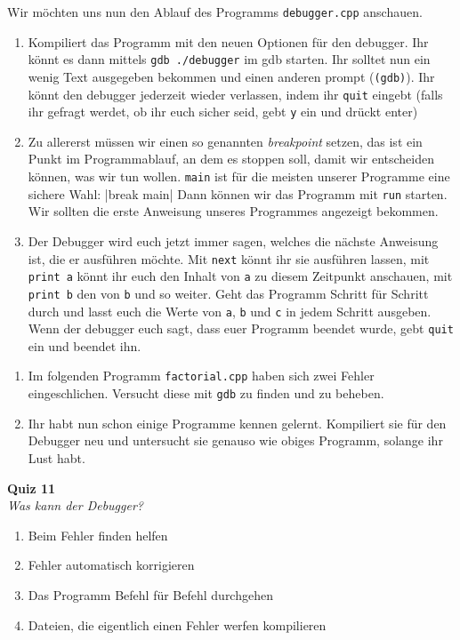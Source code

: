 \newpage

\begin{praxis}

	Wir möchten uns nun den Ablauf des Programms \texttt{debugger.cpp} anschauen.

	\begin{enumerate}
		\item Kompiliert das Programm mit den neuen Optionen für den debugger. Ihr
		      könnt es dann mittels \verb|gdb ./debugger| im gdb starten. Ihr solltet
		      nun ein wenig Text ausgegeben bekommen und einen anderen prompt
		      (\texttt{(gdb)}). Ihr könnt den debugger jederzeit wieder verlassen,
		      indem ihr \texttt{quit} eingebt (falls ihr gefragt werdet, ob ihr euch
		      sicher seid, gebt \texttt{y} ein und drückt enter)
		\item Zu allererst müssen wir einen so genannten \emph{breakpoint} setzen,
		      das ist ein Punkt im Programmablauf, an dem es stoppen soll, damit wir
		      entscheiden können, was wir tun wollen. \texttt{main} ist für die
		      meisten unserer Programme eine sichere Wahl:
		      |break main|
		      Dann können wir das Programm mit \texttt{run} starten. Wir sollten die
		      erste Anweisung unseres Programmes angezeigt bekommen.
		\item Der Debugger wird euch jetzt immer sagen, welches die nächste
		      Anweisung ist, die er ausführen möchte. Mit \texttt{next} könnt ihr sie
		      ausführen lassen, mit \texttt{print a} könnt ihr euch den Inhalt von
		      \texttt{a} zu diesem Zeitpunkt anschauen, mit \texttt{print b} den von
		      \texttt{b} und so weiter. Geht das Programm Schritt für Schritt durch
		      und lasst euch die Werte von \texttt{a}, \texttt{b} und \texttt{c} in
		      jedem Schritt ausgeben. Wenn der debugger euch sagt, dass euer Programm
		      beendet wurde, gebt \texttt{quit} ein und beendet ihn.
	\end{enumerate}
\end{praxis}

\begin{spiel}
	\begin{enumerate}
		\item Im folgenden Programm \texttt{factorial.cpp} haben sich zwei Fehler eingeschlichen. Versucht diese mit \texttt{gdb} zu finden und zu beheben.


		\item Ihr habt nun schon einige Programme kennen gelernt. Kompiliert sie
		      für den Debugger neu und untersucht sie genauso wie obiges Programm,
		      solange ihr Lust habt.
	\end{enumerate}
\end{spiel}

\textbf{Quiz 11}\\
\textit{Was kann der Debugger?}
\begin{enumerate}[label=\alph*)]
	\item Beim Fehler finden helfen
	\item Fehler automatisch korrigieren
	\item Das Programm Befehl für Befehl durchgehen
	\item Dateien, die eigentlich einen Fehler werfen kompilieren
\end{enumerate}
